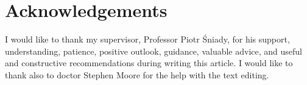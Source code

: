 \documentclass[submission]{FPSAC2021}
\begin{document}
\section*{Acknowledgements}

I would like to thank my supervisor, Professor Piotr
Śniady, for his support, understanding, patience, 
positive outlook, guidance, valuable advice, and 
useful and constructive recommendations during
writing this article. I would like to thank also 
to doctor Stephen Moore for the help with the 
text editing.

\printbibliography 
\end{document}
